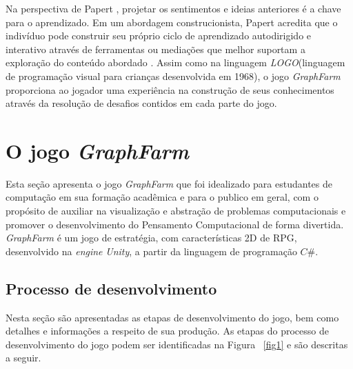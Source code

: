 \documentclass[10pt, conference, compsocconf]{IEEEtran}
\begin{document}
Na perspectiva de Papert , projetar os sentimentos e ideias anteriores é a chave para o aprendizado. Em um abordagem construcionista, Papert acredita que o indivíduo pode construir seu próprio ciclo de aprendizado autodirigido e interativo através de ferramentas ou mediações que melhor suportam a exploração do conteúdo abordado \cite{ackermann2001piaget}. Assim como na linguagem \textit{LOGO}(linguagem de programação visual para crianças desenvolvida em 1968), o jogo \textit{GraphFarm} proporciona ao jogador uma experiência na construção de seus conhecimentos através da resolução de desafios contidos em cada parte do jogo.

\section{O jogo \textit{GraphFarm}}

Esta seção apresenta o jogo \textit{GraphFarm} que foi idealizado para estudantes de computação em sua formação acadêmica e para o publico em geral, com o propósito de auxiliar na visualização e abstração de problemas computacionais e promover o desenvolvimento do Pensamento Computacional de forma divertida. \textit{GraphFarm} é um jogo de estratégia, com características 2D de RPG, desenvolvido na \textit{engine} \textit{Unity}, a partir da linguagem de programação $C\# $.


\subsection{Processo de desenvolvimento}

Nesta seção são apresentadas as etapas de desenvolvimento do jogo, bem como detalhes e informações a respeito de sua produção. As etapas do processo de desenvolvimento do jogo podem ser identificadas na Figura ~\ref{fig1} e são descritas a seguir.
\end{document}
